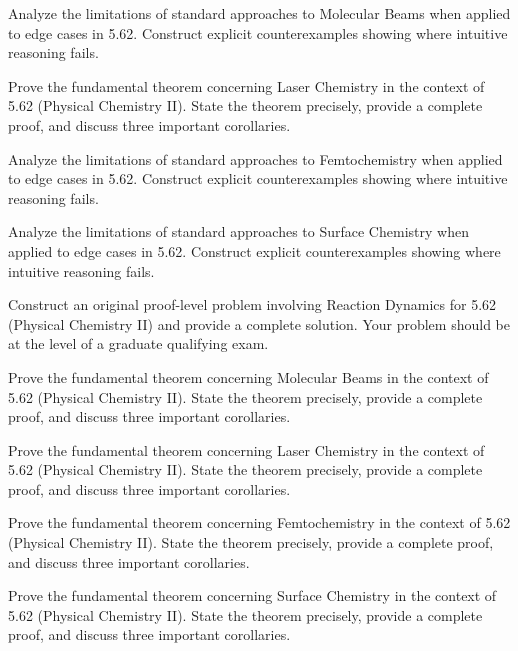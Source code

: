 \documentclass[12pt,a4paper]{exam}
\begin{document}
\begin{questions}
\vspace{0.3cm}

\question[5]
Analyze the limitations of standard approaches to Molecular Beams when applied to edge cases in 5.62. Construct explicit counterexamples showing where intuitive reasoning fails.

\vspace{0.3cm}

\question[4]
Prove the fundamental theorem concerning Laser Chemistry in the context of 5.62 (Physical Chemistry II). State the theorem precisely, provide a complete proof, and discuss three important corollaries.

\vspace{0.3cm}

\question[4]
Analyze the limitations of standard approaches to Femtochemistry when applied to edge cases in 5.62. Construct explicit counterexamples showing where intuitive reasoning fails.

\vspace{0.3cm}

\question[5]
Analyze the limitations of standard approaches to Surface Chemistry when applied to edge cases in 5.62. Construct explicit counterexamples showing where intuitive reasoning fails.

\vspace{0.3cm}

\question[7]
Construct an original proof-level problem involving Reaction Dynamics for 5.62 (Physical Chemistry II) and provide a complete solution. Your problem should be at the level of a graduate qualifying exam.

\vspace{0.3cm}

\question[3]
Prove the fundamental theorem concerning Molecular Beams in the context of 5.62 (Physical Chemistry II). State the theorem precisely, provide a complete proof, and discuss three important corollaries.

\vspace{0.3cm}

\question[2]
Prove the fundamental theorem concerning Laser Chemistry in the context of 5.62 (Physical Chemistry II). State the theorem precisely, provide a complete proof, and discuss three important corollaries.

\vspace{0.3cm}

\question[5]
Prove the fundamental theorem concerning Femtochemistry in the context of 5.62 (Physical Chemistry II). State the theorem precisely, provide a complete proof, and discuss three important corollaries.

\vspace{0.3cm}

\question[3]
Prove the fundamental theorem concerning Surface Chemistry in the context of 5.62 (Physical Chemistry II). State the theorem precisely, provide a complete proof, and discuss three important corollaries.

\vspace{0.3cm}

\end{questions}
\end{document}
